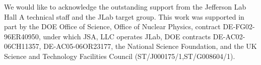 \documentclass[aps,prl,superscriptaddress,showpacs,twocolumn,floatfix,amsmath,amssymb]{revtex4-1}
\begin{document}
\begin{acknowledgments}

    We would like to acknowledge the outstanding support from the Jefferson Lab Hall A technical staff and the
    JLab target group. This work was supported in part by the DOE Office of Science, Office of Nuclear Physics,
    contract DE-FG02-96ER40950, under which JSA, LLC operates JLab, DOE contracts DE-AC02-06CH11357,
    DE-AC05-06OR23177, the National Science Foundation, and the UK Science and Technology Facilities Council
    (ST/J000175/1,ST/G008604/1).

\end{acknowledgments}

%


\end{document}
